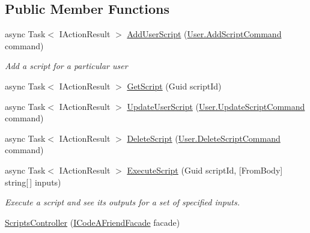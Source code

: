 \subsection*{Public Member Functions}
\begin{DoxyCompactItemize}
\item 
async Task$<$ I\+Action\+Result $>$ \mbox{\hyperlink{class_code_a_friend_1_1_api_service_1_1_controllers_1_1_scripts_controller_a65b4e550a6af06c510d0b4427c7fb7c6}{Add\+User\+Script}} (\mbox{\hyperlink{class_code_a_friend_1_1_data_model_1_1_user_1_1_add_script_command}{User.\+Add\+Script\+Command}} command)
\begin{DoxyCompactList}\small\item\em Add a script for a particular user \end{DoxyCompactList}\item 
async Task$<$ I\+Action\+Result $>$ \mbox{\hyperlink{class_code_a_friend_1_1_api_service_1_1_controllers_1_1_scripts_controller_af4d9665d07b1507138c3ef182b95e65b}{Get\+Script}} (Guid script\+Id)
\item 
async Task$<$ I\+Action\+Result $>$ \mbox{\hyperlink{class_code_a_friend_1_1_api_service_1_1_controllers_1_1_scripts_controller_a8eb92a154466710b2f9ad5def9c11503}{Update\+User\+Script}} (\mbox{\hyperlink{class_code_a_friend_1_1_data_model_1_1_user_1_1_update_script_command}{User.\+Update\+Script\+Command}} command)
\item 
async Task$<$ I\+Action\+Result $>$ \mbox{\hyperlink{class_code_a_friend_1_1_api_service_1_1_controllers_1_1_scripts_controller_a61268991951cf0238062fa5761971262}{Delete\+Script}} (\mbox{\hyperlink{class_code_a_friend_1_1_data_model_1_1_user_1_1_delete_script_command}{User.\+Delete\+Script\+Command}} command)
\item 
async Task$<$ I\+Action\+Result $>$ \mbox{\hyperlink{class_code_a_friend_1_1_api_service_1_1_controllers_1_1_scripts_controller_ae6302cfb412c5d21e540ed70809c9549}{Execute\+Script}} (Guid script\+Id, \mbox{[}From\+Body\mbox{]} string\mbox{[}$\,$\mbox{]} inputs)
\begin{DoxyCompactList}\small\item\em Execute a script and see its outputs for a set of specified inputs. \end{DoxyCompactList}\item 
\mbox{\hyperlink{class_code_a_friend_1_1_api_service_1_1_controllers_1_1_scripts_controller_ace1f2b593b4304ffdc5ae60af5288df8}{Scripts\+Controller}} (\mbox{\hyperlink{interface_code_a_friend_1_1_facade_1_1_i_code_a_friend_facade}{I\+Code\+A\+Friend\+Facade}} facade)
\end{DoxyCompactItemize}
